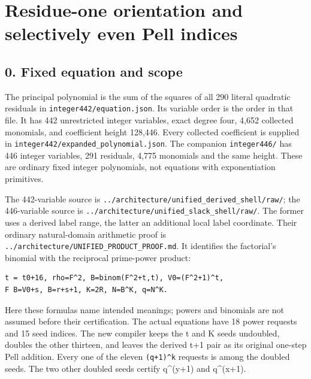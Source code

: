 \section{Residue-one orientation and selectively even Pell indices}



\subsection*{0. Fixed equation and scope}



The principal polynomial is the sum of the squares of all 290 literal quadratic residuals in \texttt{integer442/\allowbreak{}equation.json}. Its variable order is the order in that file. It has 442 unrestricted integer variables, exact degree four, 4,652 collected monomials, and coefficient height 128,446. Every collected coefficient is supplied in \texttt{integer442/\allowbreak{}expanded\_\allowbreak{}polynomial.json}. The companion \texttt{integer446/\allowbreak{}} has 446 integer variables, 291 residuals, 4,775 monomials and the same height. These are ordinary fixed integer polynomials, not equations with exponentiation primitives.



The 442-variable source is \texttt{../\allowbreak{}architecture/\allowbreak{}unified\_\allowbreak{}derived\_\allowbreak{}shell/\allowbreak{}raw/\allowbreak{}}; the 446-variable source is \texttt{../\allowbreak{}architecture/\allowbreak{}unified\_\allowbreak{}slack\_\allowbreak{}shell/\allowbreak{}raw/\allowbreak{}}. The former uses a derived label range, the latter an additional local label coordinate. Their ordinary natural-domain arithmetic proof is \texttt{../\allowbreak{}architecture/\allowbreak{}UNIFIED\_\allowbreak{}PRODUCT\_\allowbreak{}PROOF.md}. It identifies the factorial's binomial with the reciprocal prime-power product:



\begin{verbatim}
t = t0+16, rho=F^2, B=binom(F^2+t,t), V0=(F^2+1)^t,
F B=V0+s, B=r+s+1, K=2R, N=B^K, q=N^K.
\end{verbatim}

Here these formulas name intended meanings; powers and binomials are not assumed before their certification. The actual equations have 18 power requests and 15 seed indices. The new compiler keeps the t and K seeds undoubled, doubles the other thirteen, and leaves the derived t+\allowbreak{}1 pair as its original one-step Pell addition. Every one of the eleven \texttt{(q+\allowbreak{}1)\textasciicircum{}\allowbreak{}k} requests is among the doubled seeds. The two other doubled seeds certify q\textasciicircum{}\allowbreak{}(y+\allowbreak{}1) and q\textasciicircum{}\allowbreak{}(x+\allowbreak{}1).



